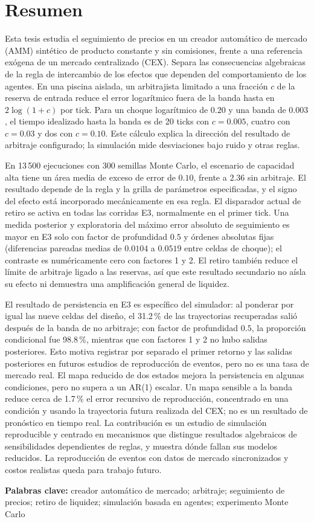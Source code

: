 \section{Resumen}

Esta tesis estudia el seguimiento de precios en un creador automático de mercado (AMM) sintético de producto constante y sin comisiones, frente a una referencia exógena de un mercado centralizado (CEX). Separa las consecuencias algebraicas de la regla de intercambio de los efectos que dependen del comportamiento de los agentes. En una piscina aislada, un arbitrajista limitado a una fracción $c$ de la reserva de entrada reduce el error logarítmico fuera de la banda hasta en $2\log(1+c)$ por tick. Para un choque logarítmico de $0.20$ y una banda de $0.003$, el tiempo idealizado hasta la banda es de 20 ticks con $c=0.005$, cuatro con $c=0.03$ y dos con $c=0.10$. Este cálculo explica la dirección del resultado de arbitraje configurado; la simulación mide desviaciones bajo ruido y otras reglas.

En 13\,500 ejecuciones con 300 semillas Monte Carlo, el escenario de capacidad alta tiene un área media de exceso de error de $0.10$, frente a $2.36$ sin arbitraje. El resultado depende de la regla y la grilla de parámetros especificadas, y el signo del efecto está incorporado mecánicamente en esa regla. El disparador actual de retiro se activa en todas las corridas E3, normalmente en el primer tick. Una medida posterior y exploratoria del máximo error absoluto de seguimiento es mayor en E3 solo con factor de profundidad $0.5$ y órdenes absolutas fijas (diferencias pareadas medias de $0.0104$ a $0.0519$ entre celdas de choque); el contraste es numéricamente cero con factores 1 y 2. El retiro también reduce el límite de arbitraje ligado a las reservas, así que este resultado secundario no aísla su efecto ni demuestra una amplificación general de liquidez.

El resultado de persistencia en E3 es específico del simulador: al ponderar por igual las nueve celdas del diseño, el 31.2\,\% de las trayectorias recuperadas salió después de la banda de no arbitraje; con factor de profundidad $0.5$, la proporción condicional fue 98.8\,\%, mientras que con factores 1 y 2 no hubo salidas posteriores. Esto motiva registrar por separado el primer retorno y las salidas posteriores en futuros estudios de reproducción de eventos, pero no es una tasa de mercado real. El mapa reducido de dos estados mejora la persistencia en algunas condiciones, pero no supera a un AR(1) escalar. Un mapa sensible a la banda reduce cerca de 1.7\,\% el error recursivo de reproducción, concentrado en una condición y usando la trayectoria futura realizada del CEX; no es un resultado de pronóstico en tiempo real. La contribución es un estudio de simulación reproducible y centrado en mecanismos que distingue resultados algebraicos de sensibilidades dependientes de reglas, y muestra dónde fallan sus modelos reducidos. La reproducción de eventos con datos de mercado sincronizados y costos realistas queda para trabajo futuro.

\textbf{Palabras clave:} creador automático de mercado; arbitraje; seguimiento de precios; retiro de liquidez; simulación basada en agentes; experimento Monte Carlo
